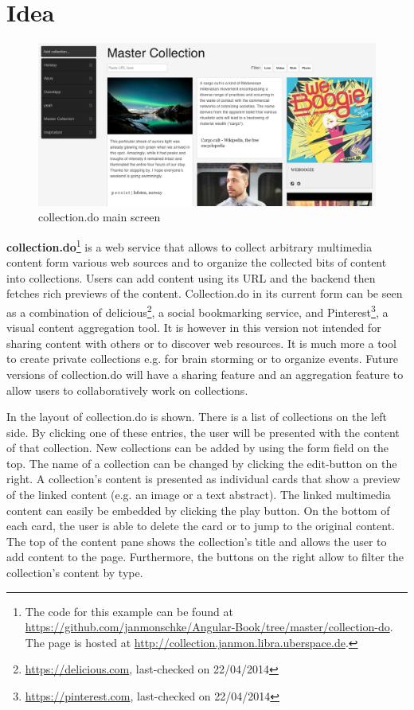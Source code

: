 \section{Idea}

\begin{figure}[h]
  \centerline{
    \includegraphics[width=\linewidth]{images/collection-screen.png}
  }
  \caption[collection.do main screen]{collection.do main screen}
  \label{fig:collection-screen}
\end{figure}

\textbf{collection.do}\footnote{The code for this example can be found at \url{https://github.com/janmonschke/Angular-Book/tree/master/collection-do}. The page is hosted at \url{http://collection.janmon.libra.uberspace.de}.} is a web service that allows to collect arbitrary multimedia content form various web sources and to organize the collected bits of content into collections. Users can add content using its URL and the backend then fetches rich previews of the content. Collection.do in its current form can be seen as a combination of delicious\footnote{\url{https://delicious.com}, last-checked on 22/04/2014}, a social bookmarking service, and Pinterest\footnote{\url{https://pinterest.com}, last-checked on 22/04/2014}, a visual content aggregation tool. It is however in this version not intended for sharing content with others or to discover web resources. It is much more a tool to create private collections e.g. for brain storming or to organize events. Future versions of collection.do will have a sharing feature and an aggregation feature to allow users to collaboratively work on collections.

In  the layout of collection.do is shown. There is a list of collections on the left side. By clicking one of these entries, the user will be presented with the content of that collection. New collections can be added by using the form field on the top. The name of a collection can be changed by clicking the edit-button on the right. A collection's content is presented as individual cards that show a preview of the linked content (e.g. an image or a text abstract). The linked multimedia content can easily be embedded by clicking the play button. On the bottom of each card, the user is able to delete the card or to jump to the original content. The top of the content pane shows the collection's title and allows the user to add content to the page. Furthermore, the buttons on the right allow to filter the collection's content by type.